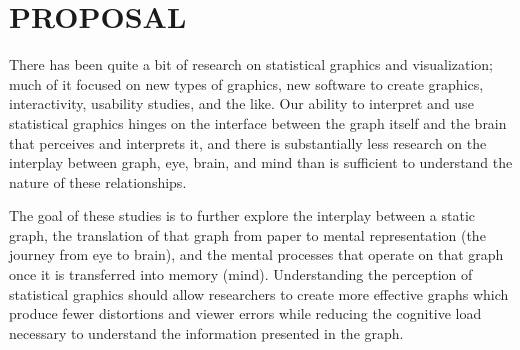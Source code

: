\documentclass[11pt]{isuthesis}\usepackage[]{graphicx}\usepackage[]{color}
\begin{document}

% 
\tableofcontents
{} \cleardoublepage {}
{}
\listoftables
\cleardoublepage {} {}
\listoffigures
% 
% 
\newpage
{}

\setcounter{chapter}{-1}
\chapter{PROPOSAL}
There has been quite a bit of research on statistical graphics and visualization; much of it focused on new types of graphics, new software to create graphics, interactivity, usability studies, and the like. Our ability to interpret and use statistical graphics hinges on the interface between the graph itself and the brain that perceives and interprets it, and there is substantially less research on the interplay between graph, eye, brain, and mind than is sufficient to understand the nature of these relationships. 

The goal of these studies is to further explore the interplay between a static graph, the translation of that graph from paper to mental representation (the journey from eye to brain), and the mental processes that operate on that graph once it is transferred into memory (mind). Understanding the perception of statistical graphics should allow researchers to create more effective graphs which produce fewer distortions and viewer errors while reducing the cognitive load necessary to understand the information presented in the graph. 
\end{document}
